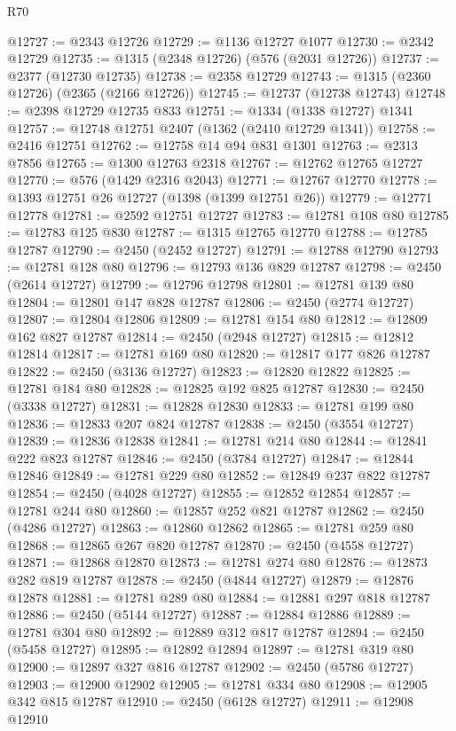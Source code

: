 \begin{lexlean}{R70}
\begin{coremodule}
@12727 := @2343 @12726
@12729 := @1136 @12727 @1077
@12730 := @2342 @12729
@12735 := @1315 (@2348 @12726) (@576 (@2031 @12726))
@12737 := @2377 (@12730 @12735)
@12738 := @2358 @12729
@12743 := @1315 (@2360 @12726) (@2365 (@2166 @12726))
@12745 := @12737 (@12738 @12743)
@12748 := @2398 @12729 @12735 @833
@12751 := @1334 (@1338 @12727) @1341
@12757 := @12748 @12751 @2407 (@1362 (@2410 @12729 @1341))
@12758 := @2416 @12751
@12762 := @12758 @14 @94 @831 @1301
@12763 := @2313 @7856
@12765 := @1300 @12763 @2318
@12767 := @12762 @12765 @12727
@12770 := @576 (@1429 @2316 @2043)
@12771 := @12767 @12770
@12778 := @1393 @12751 @26 @12727 (@1398 (@1399 @12751 @26))
@12779 := @12771 @12778
@12781 := @2592 @12751 @12727
@12783 := @12781 @108 @80
@12785 := @12783 @125 @830
@12787 := @1315 @12765 @12770
@12788 := @12785 @12787
@12790 := @2450 (@2452 @12727)
@12791 := @12788 @12790
@12793 := @12781 @128 @80
@12796 := @12793 @136 @829 @12787
@12798 := @2450 (@2614 @12727)
@12799 := @12796 @12798
@12801 := @12781 @139 @80
@12804 := @12801 @147 @828 @12787
@12806 := @2450 (@2774 @12727)
@12807 := @12804 @12806
@12809 := @12781 @154 @80
@12812 := @12809 @162 @827 @12787
@12814 := @2450 (@2948 @12727)
@12815 := @12812 @12814
@12817 := @12781 @169 @80
@12820 := @12817 @177 @826 @12787
@12822 := @2450 (@3136 @12727)
@12823 := @12820 @12822
@12825 := @12781 @184 @80
@12828 := @12825 @192 @825 @12787
@12830 := @2450 (@3338 @12727)
@12831 := @12828 @12830
@12833 := @12781 @199 @80
@12836 := @12833 @207 @824 @12787
@12838 := @2450 (@3554 @12727)
@12839 := @12836 @12838
@12841 := @12781 @214 @80
@12844 := @12841 @222 @823 @12787
@12846 := @2450 (@3784 @12727)
@12847 := @12844 @12846
@12849 := @12781 @229 @80
@12852 := @12849 @237 @822 @12787
@12854 := @2450 (@4028 @12727)
@12855 := @12852 @12854
@12857 := @12781 @244 @80
@12860 := @12857 @252 @821 @12787
@12862 := @2450 (@4286 @12727)
@12863 := @12860 @12862
@12865 := @12781 @259 @80
@12868 := @12865 @267 @820 @12787
@12870 := @2450 (@4558 @12727)
@12871 := @12868 @12870
@12873 := @12781 @274 @80
@12876 := @12873 @282 @819 @12787
@12878 := @2450 (@4844 @12727)
@12879 := @12876 @12878
@12881 := @12781 @289 @80
@12884 := @12881 @297 @818 @12787
@12886 := @2450 (@5144 @12727)
@12887 := @12884 @12886
@12889 := @12781 @304 @80
@12892 := @12889 @312 @817 @12787
@12894 := @2450 (@5458 @12727)
@12895 := @12892 @12894
@12897 := @12781 @319 @80
@12900 := @12897 @327 @816 @12787
@12902 := @2450 (@5786 @12727)
@12903 := @12900 @12902
@12905 := @12781 @334 @80
@12908 := @12905 @342 @815 @12787
@12910 := @2450 (@6128 @12727)
@12911 := @12908 @12910

\end{coremodule}
\end{lexlean}
